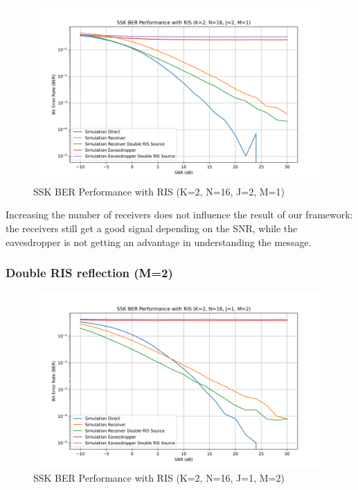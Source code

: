 \begin{figure}[H]
  \centering
  \includegraphics[width=0.9\linewidth]{imgs/ber-simulations/SSK BER Performance with RIS (K=2, N=16, J=2, M=1).png}
  \caption{SSK BER Performance with RIS (K=2, N=16, J=2, M=1)}
  \label{fig:simulation_j2_m1}
\end{figure}

Increasing the number of receivers does not influence the result of our framework: the receivers still get a good signal depending on the SNR, while the eavesdropper is not getting an advantage in understanding the message.

\subsubsection{Double RIS reflection (M=2)}

\begin{figure}[H]
  \centering
  \includegraphics[width=0.9\linewidth]{imgs/ber-simulations/SSK BER Performance with RIS (K=2, N=16, J=1, M=2).png}
  \caption{SSK BER Performance with RIS (K=2, N=16, J=1, M=2)}
  \label{fig:simulation_j1_m2}
\end{figure}


